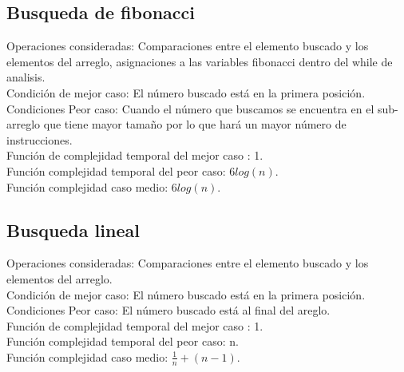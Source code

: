 \documentclass[12pt]{report}
\begin{document}
\subsection*{Busqueda de fibonacci}
Operaciones consideradas: Comparaciones entre el elemento buscado y los elementos del arreglo, asignaciones a las variables fibonacci dentro del while de analisis.\\
Condición de mejor caso: El número buscado está en la primera posición. \\
Condiciones Peor caso: Cuando el número que buscamos se encuentra en el sub-arreglo que tiene mayor tamaño por lo que hará un mayor número de instrucciones. \\
Función de complejidad temporal del mejor caso : 1.\\
Función complejidad temporal del peor caso: $6log(n)$. \\
Función complejidad caso medio: $6log(n)$.\\
\subsection*{Busqueda lineal}
Operaciones consideradas: Comparaciones entre el elemento buscado y los elementos del arreglo.\\
Condición de mejor caso: El número buscado está en la primera posición. \\
Condiciones Peor caso: El número buscado está al final del areglo. \\
Función de complejidad temporal del mejor caso : 1. \\
Función complejidad temporal del peor caso: n. \\
Función complejidad caso medio: $\frac{1}{n}+(n-1)$.\\
\end{document}
